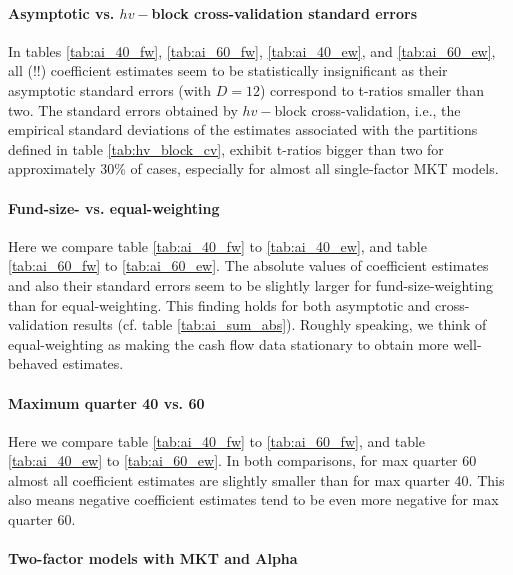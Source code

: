 \documentclass[12pt]{article}
\begin{document}
\paragraph{Asymptotic vs. $hv-$block cross-validation standard errors}

In tables \ref{tab:ai_40_fw}, \ref{tab:ai_60_fw}, \ref{tab:ai_40_ew}, and  \ref{tab:ai_60_ew}, all (!!) coefficient estimates seem to be statistically insignificant as their asymptotic standard errors (with $D=12$)  correspond to t-ratios smaller than two.
The standard errors obtained by $hv-$block cross-validation, i.e., the empirical standard deviations of the estimates associated with the partitions defined in table \ref{tab:hv_block_cv}, exhibit t-ratios bigger than two for approximately 30\% of cases, especially for almost all single-factor MKT models.

\paragraph{Fund-size- vs. equal-weighting}

Here we compare table \ref{tab:ai_40_fw} to \ref{tab:ai_40_ew}, and table \ref{tab:ai_60_fw} to \ref{tab:ai_60_ew}.
The absolute values of coefficient estimates and also their standard errors seem to be slightly larger for fund-size-weighting than for equal-weighting. 
This finding holds for both asymptotic and cross-validation results (cf. table \ref{tab:ai_sum_abs}).
Roughly speaking, we think of equal-weighting as making the cash flow data stationary to obtain more well-behaved estimates.


\paragraph{Maximum quarter 40 vs. 60}

Here we compare table \ref{tab:ai_40_fw} to \ref{tab:ai_60_fw}, and table \ref{tab:ai_40_ew} to \ref{tab:ai_60_ew}.
In both comparisons, for max quarter 60 almost all coefficient estimates are slightly smaller than for max quarter 40.
This also means negative coefficient estimates tend to be even more negative for max quarter 60.


\paragraph{Two-factor models with MKT and Alpha}
\end{document}
